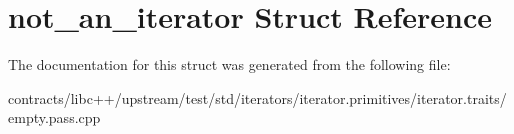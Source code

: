 \hypertarget{structnot__an__iterator}{}\section{not\+\_\+an\+\_\+iterator Struct Reference}
\label{structnot__an__iterator}


The documentation for this struct was generated from the following file\+:\begin{DoxyCompactItemize}
\item 
contracts/libc++/upstream/test/std/iterators/iterator.\+primitives/iterator.\+traits/empty.\+pass.\+cpp\end{DoxyCompactItemize}
